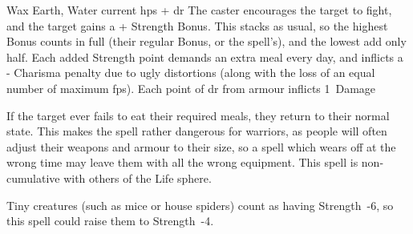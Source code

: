  {}%
  {Wax}%
  {Earth, Water}%
  {current \glspl{hp} + \gls{dr}}%
  {The caster encourages the target to fight, and the target gains a + Strength Bonus.
  This stacks as usual, so the highest Bonus counts in full (their regular Bonus, or the spell's), and the lowest add only half.
  Each added Strength point demands an extra meal every day, and inflicts a - Charisma penalty due to ugly distortions (along with the loss of an equal number of maximum \glspl{fp}).
  Each point of \gls{dr} from armour inflicts 1~Damage}%
  {
    If the target ever fails to eat their required meals, they return to their normal state.
    This makes the spell rather dangerous for warriors, as people will often adjust their weapons and armour to their size, so a spell which wears off at the wrong time may leave them with all the wrong equipment.
    This spell is non-cumulative with others of the Life sphere.

    Tiny creatures (such as mice or house spiders) count as having Strength~-6, so this spell could raise them to Strength~-4.
    }
